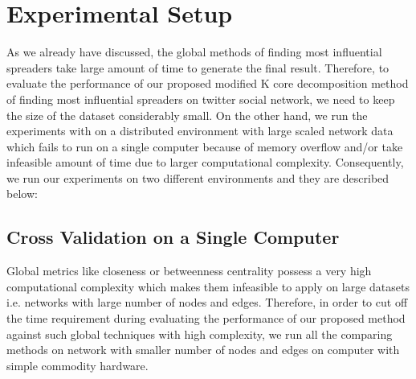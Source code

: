 \documentclass[sigconf]{acmart}
\begin{document}
\section{Experimental Setup}
As we already have discussed, the global methods of finding most influential spreaders take large amount of time to generate the final result. Therefore, to evaluate the performance of our proposed modified K core decomposition method of finding most influential spreaders on twitter social network, we need to keep the size of the dataset considerably small. On the other hand, we run the experiments with on a distributed environment with large scaled network data which fails to run on a single computer because of memory overflow and/or take infeasible amount of time due to larger computational complexity. Consequently, we run our experiments on two different environments and they are described below:

\subsection{Cross Validation on a Single Computer}
Global metrics like closeness or betweenness centrality possess a very high computational complexity which makes them infeasible to apply on large datasets i.e. networks with large number of nodes and edges. Therefore, in order to cut off the time requirement during evaluating the performance of our proposed method against such global techniques with high complexity, we run all the comparing methods on network with smaller number of nodes and edges  
on computer with simple commodity hardware. 
\end{document}
